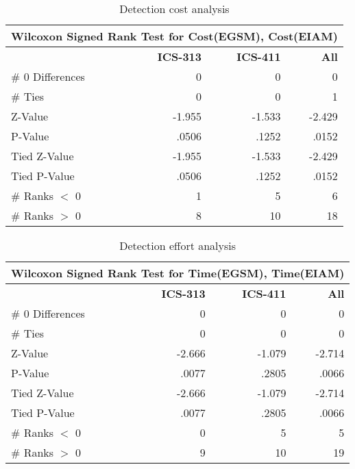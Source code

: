 \begin{table}[htb]
 \caption{Detection cost analysis}
 \begin{center}
 \begin{tabular}{|l|r|r|r|}
  \hline
  \multicolumn{4}{|c|}{\bf Wilcoxon Signed Rank Test for Cost(EGSM),
Cost(EIAM)}\\
  \hline
  & {\bf ICS-313} & {\bf ICS-411} & {\bf All} \\
  \hline
  \# 0 Differences & 0 & 0 & 0 \\
  \# Ties          & 0 & 0 & 1 \\
  Z-Value          & -1.955 & -1.533 & -2.429\\
  P-Value          & .0506 & .1252 & .0152\\
  Tied Z-Value     & -1.955 & -1.533 & -2.429\\
  Tied P-Value     & .0506 & .1252 & .0152\\
  \# Ranks $<$ 0   & 1     & 5 & 6\\
  \# Ranks $>$ 0   & 8     & 10 & 18\\
  \hline
     \end{tabular}
  \end{center}
  \label{detection-cost-analysis} \end{table}


\begin{table}[htb]
 \caption{Detection effort analysis}
 \begin{center}
 \begin{tabular}{|l|r|r|r|}
  \hline
  \multicolumn{4}{|c|}{\bf Wilcoxon Signed Rank Test for Time(EGSM),
Time(EIAM)}\\
  \hline
  & {\bf ICS-313} & {\bf ICS-411} & {\bf All} \\
  \hline
  \# 0 Differences & 0 & 0 & 0 \\
  \# Ties          & 0 & 0 & 0 \\
  Z-Value         & -2.666 & -1.079 & -2.714\\
  P-Value         & .0077 & .2805 & .0066\\
  Tied Z-Value    & -2.666 & -1.079 & -2.714\\
  Tied P-Value    & .0077 & .2805 & .0066\\
  \# Ranks $<$ 0  & 0 & 5 & 5\\
  \# Ranks $>$ 0  & 9 & 10 & 19\\
  \hline
     \end{tabular}
  \end{center}
  \label{detection-effort-analysis} \end{table}

